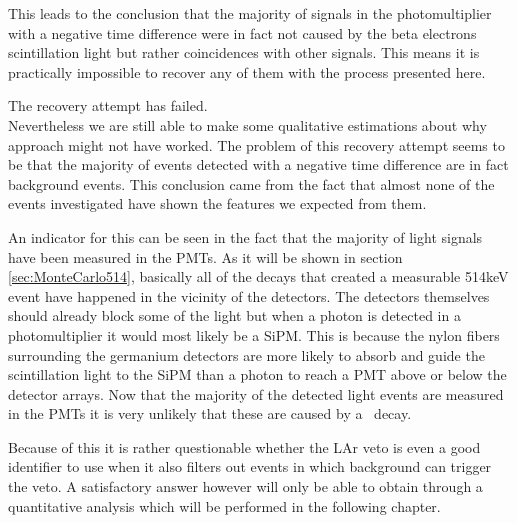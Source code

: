 \documentclass[encoding=utf8,british]{tumphthesis}
\begin{document}
This leads to the conclusion that the majority of signals in the photomultiplier with a negative time difference were in fact not caused by the beta electrons scintillation light but rather coincidences with other signals.
This means it is practically impossible to recover any of them with the process presented here.

The recovery attempt has failed.
\\

Nevertheless we are still able to make some qualitative estimations about why approach might not have worked. 
The problem of this recovery attempt seems to be that the majority of events detected with a negative time difference are in fact background events.
This conclusion came from the fact that almost none of the events investigated have shown the features we expected from them.

An indicator for this can be seen in the fact that the majority of light signals have been measured in the PMTs.
As it will be shown in section \ref{sec:MonteCarlo514}, basically all of the decays that created a measurable 514keV event have happened in the vicinity of the detectors.
The detectors themselves should already block some of the light but when a photon is detected in a photomultiplier it would most likely be a SiPM.
This is because the nylon fibers surrounding the germanium detectors are more likely to absorb and guide the scintillation light to the SiPM than a photon to reach a PMT above or below the detector arrays.
Now that the majority of the detected light events are measured in the PMTs it is very unlikely that these are caused by a \Kr\ decay.

Because of this it is rather questionable whether the LAr veto is even a good identifier to use when it also filters out events in which background can trigger the veto.
A satisfactory answer however will only be able to obtain through a quantitative analysis which will be performed in the following chapter.
\\
\end{document}
